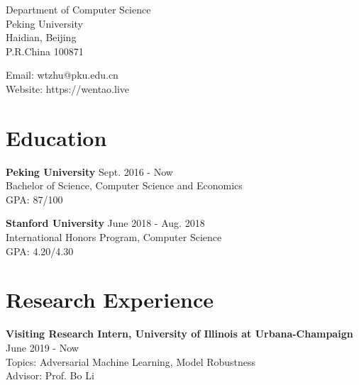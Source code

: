 \documentclass{academiccv}
\begin{document}
\raggedright


\vspace{1em}
\begin{minipage}[t]{0.495\textwidth}
  Department of Computer Science \\
 Peking University\\
  Haidian, Beijing\\
  P.R.China 100871
\end{minipage}
\begin{minipage}[t]{0.495\textwidth}
  Email: wtzhu@pku.edu.cn \\
  Website: https://wentao.live \\
\end{minipage}
\vspace{0.5em}


\section*{Education}



\textbf{Peking University} \hfill Sept. 2016 - Now  \\
Bachelor of Science, Computer Science and Economics \\
GPA: 87/100 \newline

\textbf{Stanford University} \hfill June 2018 - Aug. 2018 \\
International Honors Program, Computer Science \\
GPA: 4.20/4.30 \\

\section*{Research Experience}

\textbf{Visiting Research Intern, University of Illinois at Urbana-Champaign} \hfill June 2019 - Now  \\
Topics: Adversarial Machine Learning, Model Robustness \\
Advisor: Prof. Bo Li \newline
\end{document}
